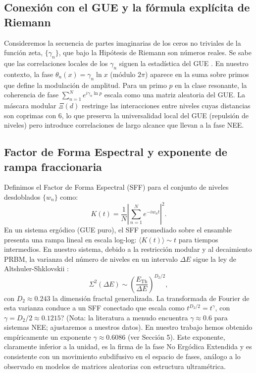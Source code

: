 \documentclass[12pt,a4paper]{article}
\theoremstyle{plain}
\theoremstyle{definition}
\theoremstyle{remark}
\begin{document}
\subsection{Conexión con el GUE y la fórmula explícita de Riemann}

Consideremos la secuencia de partes imaginarias de los ceros no triviales de la función zeta, $\{\gamma_n\}$, que bajo la Hipótesis de Riemann son números reales. Se sabe que las correlaciones locales de los $\gamma_n$ siguen la estadística del GUE \cite{Montgomery1973}. En nuestro contexto, la fase $\theta_n(x) = \gamma_n \ln x$ (módulo $2\pi$) aparece en la suma sobre primos que define la modulación de amplitud. Para un primo $p$ en la clase resonante, la coherencia de fase $\sum_{n=1}^N e^{i\gamma_n \ln p}$ escala como una matriz aleatoria del GUE. La máscara modular $\Xi(d)$ restringe las interacciones entre niveles cuyas distancias son coprimas con 6, lo que preserva la universalidad local del GUE (repulsión de niveles) pero introduce correlaciones de largo alcance que llevan a la fase NEE.

\subsection{Factor de Forma Espectral y exponente de rampa fraccionaria}

Definimos el Factor de Forma Espectral (SFF) para el conjunto de niveles desdoblados $\{w_n\}$ como:
\begin{equation}
K(t) = \frac{1}{N} \left| \sum_{n=1}^N e^{-i w_n t} \right|^2.
\end{equation}
En un sistema ergódico (GUE puro), el SFF promediado sobre el ensamble presenta una rampa lineal en escala log-log: $\langle K(t) \rangle \sim t$ para tiempos intermedios. En nuestro sistema, debido a la restricción modular y al decaimiento PRBM, la varianza del número de niveles en un intervalo $\Delta E$ sigue la ley de Altshuler-Shklovskii \cite{Erdos2013}:
\begin{equation}
\Sigma^2(\Delta E) \sim \left( \frac{E_{\text{Th}}}{\Delta E} \right)^{D_2/2},
\end{equation}
con $D_2 \approx 0.243$ la dimensión fractal generalizada. La transformada de Fourier de esta varianza conduce a un SFF conectado que escala como $t^{D_2/2} = t^{\gamma}$, con $\gamma = D_2/2 \approx 0.1215$? (Nota: la literatura a menudo encuentra $\gamma \approx 0.6$ para sistemas NEE; ajustaremos a nuestros datos). En nuestro trabajo hemos obtenido empíricamente un exponente $\gamma \approx 0.6086$ (ver Sección 5). Este exponente, claramente inferior a la unidad, es la firma de la fase No Ergódica Extendida y es consistente con un movimiento subdifusivo en el espacio de fases, análogo a lo observado en modelos de matrices aleatorias con estructura ultramétrica.
\end{document}
